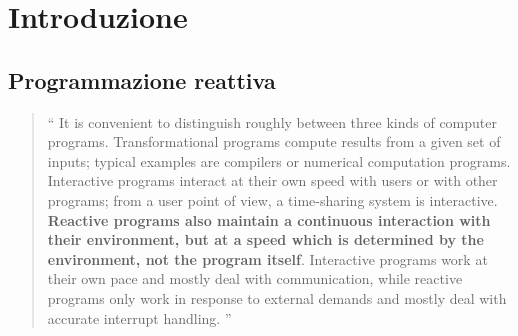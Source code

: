     \begin{frame}[c]
        \titlepage
    \end{frame}

    \section{Introduzione}\label{sec:intro}
        \subsection{Programmazione reattiva}\label{subsec:react}
        \begin{frame}{\insertsectionhead}
            \begin{block}{\insertsubsectionhead}
                \smallskip
                \begin{quote}
                    `` It is convenient to distinguish roughly between three kinds of computer programs.
                    Transformational programs compute results from a given set of inputs;
                    typical examples are compilers or numerical computation programs.
                    Interactive programs interact at their own speed with users or with other programs;
                    from a user point of view, a time-sharing system is interactive.
                    \textbf{Reactive programs also maintain a continuous interaction with their environment, but at a speed which is determined by the environment, not the program itself}.
                    Interactive programs work at their own pace and mostly deal with communication, while reactive programs only work in response to external demands and mostly deal with accurate interrupt handling. ''
                \end{quote}
            \end{block}
        \end{frame}

